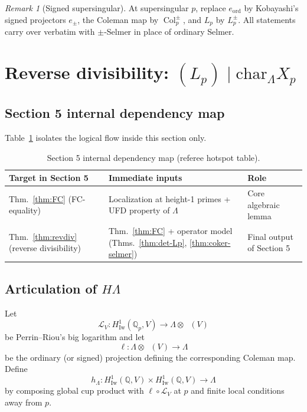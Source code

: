 \documentclass[12pt,reqno]{amsart}
\theoremstyle{definition}
\theoremstyle{remark}
\newtheorem{remark}[theorem]{Remark}
\newcommand{\Q}{\mathbb{Q}}
\newcommand{\Qp}{\mathbb{Q}_p}
\newcommand{\Lam}{\Lambda}
\newcommand{\chr}{\mathrm{char}}
\DeclareMathOperator{\Col}{Col}
\DeclareMathOperator{\Dcris}{D_{\mathrm{cris}}}
\begin{document}
\begin{remark}[Signed supersingular]
At supersingular $p$, replace $e_{\mathrm{ord}}$ by Kobayashi's signed projectors $e_\pm$, the Coleman map by $\Col_p^\pm$, and $L_p$ by $L_p^\pm$.  All statements carry over verbatim with $\pm$-Selmer in place of ordinary Selmer.
\end{remark}

\section{Reverse divisibility: $(L_p)\mid\chr_\Lam X_p$}\label{sec:revdiv}

\subsection*{Section 5 internal dependency map}
Table~\ref{tab:depmap-sec5} isolates the logical flow inside this section only.

\begin{table}[h]
\centering
\footnotesize
\renewcommand{\arraystretch}{1.12}
\begin{tabular}{|p{}|p{}|p{}|}
\hline
\textbf{Target in Section 5} & \textbf{Immediate inputs} & \textbf{Role} \\
\hline
Thm.~\ref{thm:FC} (FC-equality) &
Localization at height-1 primes + UFD property of $\Lam$ &
Core algebraic lemma \\
\hline
Thm.~\ref{thm:revdiv} (reverse divisibility) &
Thm.~\ref{thm:FC} + operator model (Thms.~\ref{thm:det-Lp}, \ref{thm:coker-selmer}) &
Final output of Section 5 \\
\hline
\end{tabular}
\caption{Section 5 internal dependency map (referee hotspot table).}
\label{tab:depmap-sec5}
\end{table}

\subsection{Articulation of $H\Lam$}

Let
\[
\mathcal L_V:H^1_{\mathrm{Iw}}(\Qp,V)\longrightarrow \Lam\otimes \Dcris(V)
\]
be Perrin--Riou's big logarithm and let
\[
\ell:\Lam\otimes\Dcris(V)\longrightarrow\Lam
\]
be the ordinary (or signed) projection defining the corresponding Coleman map.
Define
\[
h_\Lam:H^1_{\mathrm{Iw}}(\Q,V)\times H^1_{\mathrm{Iw}}(\Q,V)\to\Lam
\]
by composing global cup product with $\ell\circ\mathcal L_V$ at $p$ and finite local conditions away from $p$.
\end{document}
